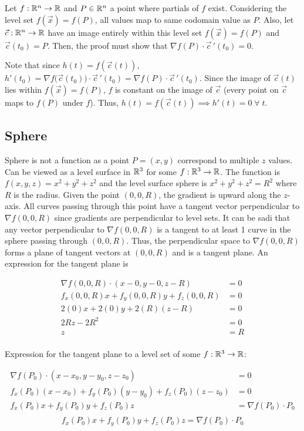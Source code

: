 Let $f:\mathbb{R}^n\to \mathbb{R}$ and $P\in \mathbb{R}^n$ a point where partials of $f$ exist. Considering the level set $f(\vec{x})=f(P)$,
all values map to same codomain value as $P$. Also, let $\vec{c}:\mathbb{R}^n\to \mathbb{R}$ have an image entirely within this level set $f(\vec{x})=f(P)$
and $\vec{c}(t_0)=P$. Then, the proof must show that $\nabla f(P)\cdot \vec c\,'(t_0)=0$.

Note that since $h(t)=f(\vec{c}(t))$, $h'(t_0)=\nabla f \Big(\vec c (t_0) \Big)\cdot \vec c\,'(t_0)=\nabla f (P)\cdot  \vec c\,'(t_0)$.
Since the image of $\vec{c}(t)$ lies within $f(\vec{x})=f(P)$, $f$ is constant on the image of $\vec{c}$ (every point on $\vec{c}$ maps to $f(P)$ under $f$).
Thus, $h(t)=f(\vec{c}(t))\implies h'(t)=0\;\forall\;t$.

\subsection{Sphere}

Sphere is not a function as a point $P=(x,y)$ correspond to multiple $z$ values.
Can be viewed as a level surface in $\mathbb{R}^3$ for some $f:\mathbb{R}^3\to \mathbb{R}$. The function is $f(x,y,z)=x^2+y^2+z^2$
and the level surface sphere is $x^2+y^2+z^2=R^2$ where $R$ is the radius.
Given the point $(0,0,R)$, the gradient is upward along the $z$-axis. All curves passing through this point
have a tangent vector perpendicular to $\nabla f(0,0,R)$ since gradients are perpendicular to level sets.
It can be sadi that any vector perpendicular to $\nabla f(0,0,R)$ is a tangent to at least 1 curve in the sphere passing through $(0,0,R)$.
Thus, the perpendicular space to $\nabla f(0,0,R)$ forms a plane of tangent vectors at $(0,0,R)$ and is a tangent plane.
An expression for the tangent plane is 

\begin{align*}
    \nabla f (0,0,R)\cdot(x-0, y-0, z-R)&=0\\
    f_x(0,0,R)x+f_y(0,0,R)y+f_z(0,0,R)&=0\\
    2(0)x+2(0)y+2(R)(z-R)&=0\\
    2Rz-2R^2&=0\\
    z&=R\\
\end{align*}

Expression for the tangent plane to a level set of some $f:\mathbb{R}^3\to \mathbb{R}$:

\begin{align*}
    \nabla f (P_0)\cdot(x-x_0, y-y_0,z- z_0)&=0\\
    f_x(P_0)(x-x_0)+f_y(P_0)(y-y_0)+f_z(P_0)(z-z_0)&=0\\
    f_x(P_0)x+f_y(P_0)y+f_z(P_0)z&=\nabla f(P_0)\cdot P_0\\
\end{align*}
$$\boxed{f_x(P_0)x+f_y(P_0)y+f_z(P_0)z=\nabla f(P_0)\cdot P_0}$$